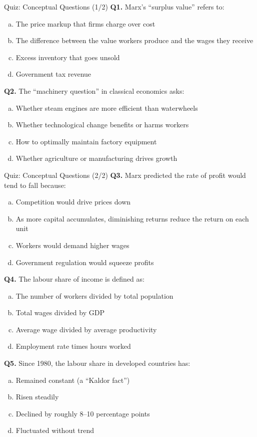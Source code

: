 \documentclass[aspectratio=169, 10pt]{beamer}
\begin{document}
\begin{frame}{Quiz: Conceptual Questions (1/2)}
\textbf{Q1.} Marx's ``surplus value'' refers to:
\begin{enumerate}[(a)]
  \item The price markup that firms charge over cost
  \item The difference between the value workers produce and
        the wages they receive
  \item Excess inventory that goes unsold
  \item Government tax revenue
\end{enumerate}
\vspace{0.5em}
\textbf{Q2.} The ``machinery question'' in classical economics asks:
\begin{enumerate}[(a)]
  \item Whether steam engines are more efficient than waterwheels
  \item Whether technological change benefits or harms workers
  \item How to optimally maintain factory equipment
  \item Whether agriculture or manufacturing drives growth
\end{enumerate}
\end{frame}

\begin{frame}{Quiz: Conceptual Questions (2/2)}
\textbf{Q3.} Marx predicted the rate of profit would tend to fall because:
\begin{enumerate}[(a)]
  \item Competition would drive prices down
  \item As more capital accumulates, diminishing returns reduce
        the return on each unit
  \item Workers would demand higher wages
  \item Government regulation would squeeze profits
\end{enumerate}
\vspace{0.5em}
\textbf{Q4.} The labour share of income is defined as:
\begin{enumerate}[(a)]
  \item The number of workers divided by total population
  \item Total wages divided by GDP
  \item Average wage divided by average productivity
  \item Employment rate times hours worked
\end{enumerate}
\vspace{0.5em}
\textbf{Q5.} Since 1980, the labour share in developed countries has:
\begin{enumerate}[(a)]
  \item Remained constant (a ``Kaldor fact'')
  \item Risen steadily
  \item Declined by roughly 8--10 percentage points
  \item Fluctuated without trend
\end{enumerate}
\end{frame}
\end{document}
